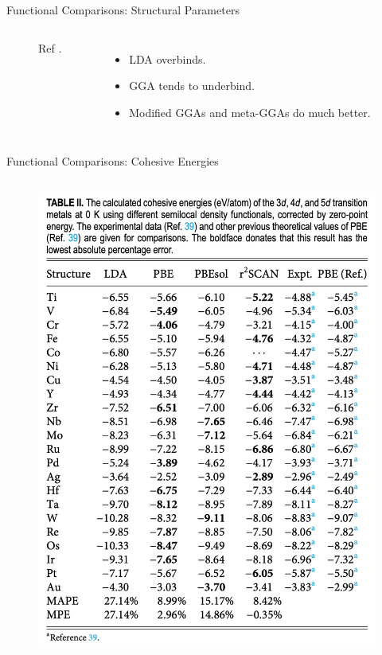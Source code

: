 \documentclass[aspectratio=169]{beamer}
\begin{document}
\begin{frame}{Functional Comparisons: Structural Parameters}
\begin{columns}
\begin{figure}
                \caption{Ref \cite{liuAssessingR2SCANMetaGGA2024}.}
            \end{figure}
            \begin{itemize}
                \item LDA overbinds.
                \item GGA tends to underbind.
                \item Modified GGAs and meta-GGAs do much better.
            \end{itemize}
        \end{columns}
    \end{frame}


    \begin{frame}{Functional Comparisons: Cohesive Energies}
        \begin{columns}
            \begin{figure}
                \includegraphics[width=\linewidth]{lectures/figures/6_cohesive_energies.png}

\end{figure}
\end{columns}
\end{frame}
\end{document}
